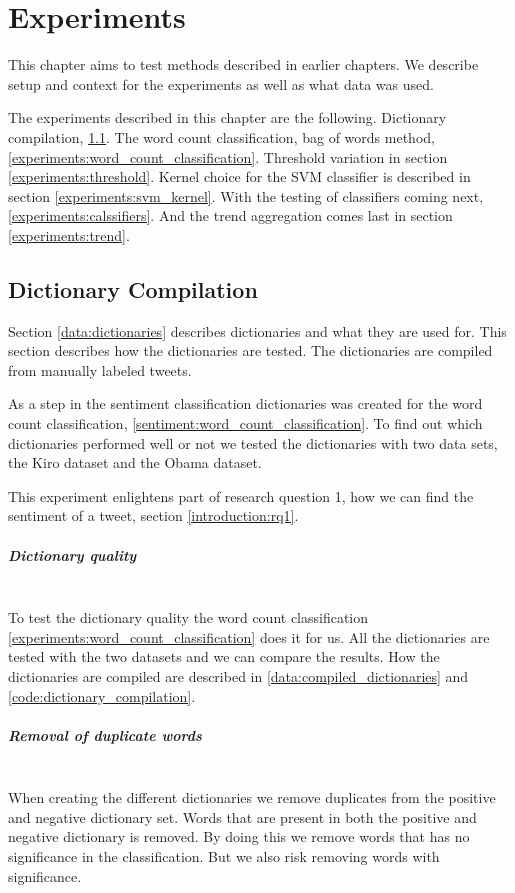 \chapter{Experiments}\label{experiments}
This chapter aims to test methods described in earlier chapters. We describe
setup and context for the experiments as well as what data was used.

The experiments described in this chapter are the following. Dictionary
compilation, \ref{experiments:dictionaries}. The word count classification, bag
of words method, \ref{experiments:word_count_classification}. Threshold
variation in section \ref{experiments:threshold}. Kernel choice for the SVM
classifier is described in section \ref{experiments:svm_kernel}. With the
testing of classifiers coming next, \ref{experiments:calssifiers}. And the trend
aggregation comes last in section \ref{experiments:trend}.

\section{Dictionary Compilation}\label{experiments:dictionaries}
Section \ref{data:dictionaries} describes dictionaries and what they are used
for. This section describes how the dictionaries are tested. 
The dictionaries are compiled from manually labeled tweets.

As a step in the sentiment classification dictionaries was created for the
word count classification, \ref{sentiment:word_count_classification}.
To find out which dictionaries performed well or not we tested the dictionaries
with two data sets, the Kiro dataset and the Obama dataset. 

This experiment enlightens part of research question 1,
how we can find the sentiment of a tweet, section \ref{introduction:rq1}.

\paragraph{Dictionary quality}
\hspace{0pt}\\
To test the dictionary quality the word count classification
\ref{experiments:word_count_classification} does it for us. All the
dictionaries are tested with the two datasets and we can compare the results. 
How the dictionaries are compiled are described in
\ref{data:compiled_dictionaries} and \ref{code:dictionary_compilation}.

\paragraph{Removal of duplicate words}
\hspace{0pt}\\
When creating the different dictionaries we remove duplicates from the positive
and negative dictionary set. Words that are present in both the positive and
negative dictionary is removed. By doing this we remove words that has no
significance in the classification. But we also risk removing words with
significance.

